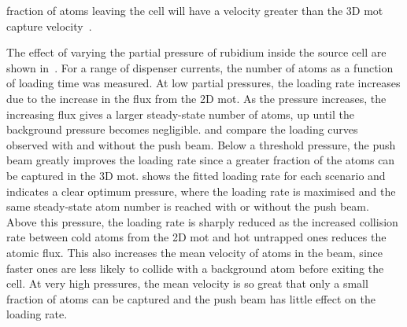 fraction of atoms leaving the cell will have a velocity greater than the 3D
\ac{mot} capture velocity~\cite{Schoser2002}. \par\noindent The effect of
varying the partial pressure of rubidium inside the source cell are shown
in~. For a range of dispenser currents, the number
of atoms as a function of loading time was measured. At low partial pressures,
the loading rate increases due to the increase in the flux from the 2D \ac{mot}.
As the pressure increases, the increasing flux gives a larger steady-state
number of atoms, up until the background pressure becomes negligible.
 and  compare the loading
curves observed with and without the push beam. Below a threshold pressure, the
push beam greatly improves the loading rate since a greater fraction of the
atoms can be captured in the 3D \ac{mot}.  shows the
fitted loading rate for each scenario and indicates a clear optimum pressure,
where the loading rate is maximised and the same steady-state atom number is
reached with or without the push beam. Above this pressure, the loading rate is
sharply reduced as the increased collision rate between cold atoms from the 2D
\ac{mot} and hot untrapped ones reduces the atomic flux. This also increases the
mean velocity of atoms in the beam, since faster ones are less likely to collide
with a background atom before exiting the cell. At very high pressures, the mean
velocity is so great that only a small fraction of atoms can be captured and the
push beam has little effect on the loading rate.

